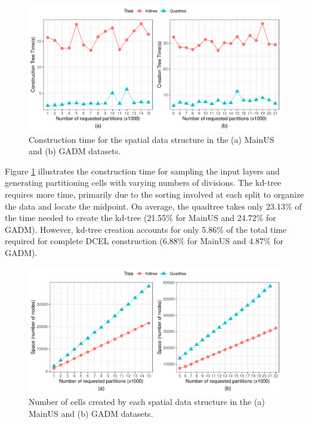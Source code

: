  \begin{figure}
    \centering
    \includegraphics[width=\textwidth]{chapterExtension/K/K_Creation}
    \caption{Construction time for the spatial data structure in the (a) MainUS and (b) GADM datasets.}\label{fig:k_creation_us}
 \end{figure}

Figure \ref{fig:k_creation_us} illustrates the construction time for sampling the input layers and generating partitioning cells with varying numbers of divisions. The kd-tree requires more time, primarily due to the sorting involved at each split to organize the data and locate the midpoint. On average, the quadtree takes only 23.13\% of the time needed to create the kd-tree (21.55\% for MainUS and 24.72\% for GADM). However, kd-tree creation accounts for only 5.86\% of the total time required for complete DCEL construction (6.88\% for MainUS and 4.87\% for GADM).

 \begin{figure}
    \centering
    \includegraphics[width=\textwidth]{chapterExtension/K/K_Space} 
    \caption{Number of cells created by each spatial data structure in the (a) MainUS and (b) GADM datasets.} \label{fig:k_space_us}
 \end{figure}

